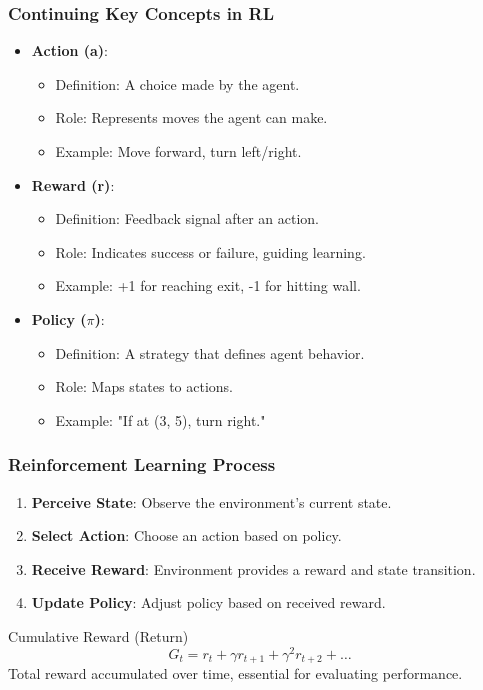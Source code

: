 \documentclass[aspectratio=169]{beamer}
\begin{document}
\begin{frame}[fragile]
    \frametitle{Continuing Key Concepts in RL}
    \begin{itemize}
        \item \textbf{Action (a)}:
            \begin{itemize}
                \item Definition: A choice made by the agent.
                \item Role: Represents moves the agent can make.
                \item Example: Move forward, turn left/right.
            \end{itemize}

        \item \textbf{Reward (r)}:
            \begin{itemize}
                \item Definition: Feedback signal after an action.
                \item Role: Indicates success or failure, guiding learning.
                \item Example: +1 for reaching exit, -1 for hitting wall.
            \end{itemize}
        
        \item \textbf{Policy ($\pi$)}:
            \begin{itemize}
                \item Definition: A strategy that defines agent behavior.
                \item Role: Maps states to actions.
                \item Example: "If at (3, 5), turn right."
            \end{itemize}
    \end{itemize}
\end{frame}

\begin{frame}[fragile]
    \frametitle{Reinforcement Learning Process}
    \begin{enumerate}
        \item \textbf{Perceive State}: Observe the environment's current state.
        \item \textbf{Select Action}: Choose an action based on policy.
        \item \textbf{Receive Reward}: Environment provides a reward and state transition.
        \item \textbf{Update Policy}: Adjust policy based on received reward.
    \end{enumerate}

    \begin{block}{Cumulative Reward (Return)}
        \begin{equation}
            G_t = r_t + \gamma r_{t+1} + \gamma^2 r_{t+2} + \ldots
        \end{equation}
        Total reward accumulated over time, essential for evaluating performance.
    \end{block}
\end{frame}
\end{document}
